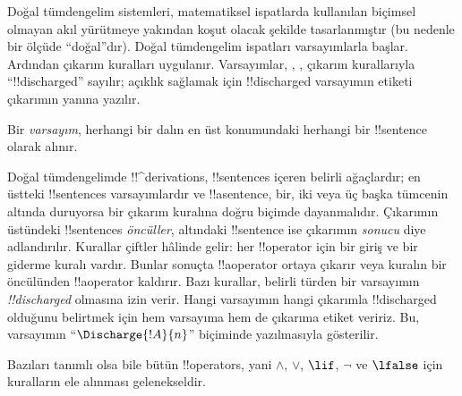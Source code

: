 \documentclass[../../../include/open-logic-section]{subfiles}
\begin{document}
      {}
      {}


\begin{explain}
Doğal tümdengelim sistemleri, matematiksel ispatlarda kullanılan biçimsel
olmayan akıl yürütmeye yakından koşut olacak şekilde tasarlanmıştır (bu
nedenle bir ölçüde ``doğal''dır). Doğal tümdengelim ispatları varsayımlarla
başlar. Ardından çıkarım kuralları uygulanır. Varsayımlar, \Intro{\lnot},
\Intro{\lif},  çıkarım kurallarıyla ``!!{discharged}'' sayılır; açıklık sağlamak için
!!{discharged} varsayımın etiketi çıkarımın yanına yazılır.
\end{explain}

\begin{defn}[Varsayım]
Bir \emph{varsayım}, herhangi bir dalın en üst konumundaki herhangi bir
!!{sentence} olarak alınır.
\end{defn}

Doğal tümdengelimde !!^{derivation}s, !!{sentence}s içeren belirli ağaçlardır;
en üstteki !!{sentence}s varsayımlardır ve !!a{sentence}, bir, iki veya üç
başka tümcenin altında duruyorsa bir çıkarım kuralına doğru biçimde dayanmalıdır.
Çıkarımın üstündeki !!{sentence}s \emph{öncüller}, altındaki !!{sentence} ise
çıkarımın \emph{sonucu} diye adlandırılır. Kurallar çiftler hâlinde gelir: her
!!{operator} için bir giriş ve bir giderme kuralı vardır. Bunlar sonuçta
!!a{operator} ortaya çıkarır veya kuralın bir öncülünden !!a{operator}
kaldırır. Bazı kurallar, belirli türden bir varsayımın
\emph{!!{discharged}} olmasına izin verir. Hangi varsayımın hangi çıkarımla
!!{discharged} olduğunu belirtmek için hem varsayıma hem de çıkarıma etiket
veririz. Bu, varsayımın ``$\Discharge{!A}{n}$'' biçiminde yazılmasıyla
gösterilir.


%
	{Bazıları tanımlı olsa bile bütün !!{operator}s, yani $\land$, $\lor$,
  $\lif$, $\lnot$ ve $\lfalse$ için kuralların ele alınması gelenekseldir.}
\end{document}
